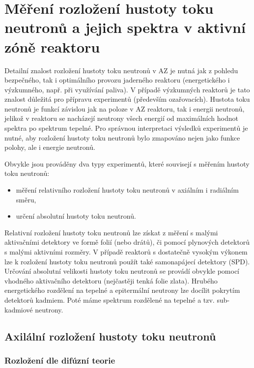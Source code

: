 \section[Měření rozložení hustoty toku]{Měření rozložení hustoty toku neutronů a jejich spektra v aktivní zóně reaktoru}

Detailní znalost rozložení hustoty toku neutronů v AZ je nutná jak z pohledu bezpečného, tak i optimálního provozu jaderného reaktoru (energetického i výzkumného, např. při využívání paliva). V případě výzkumných reaktorů je tato znalost důležitá pro přípravu experimentů (především ozařovacích). Hustota toku neutronů je funkcí závislou jak na poloze v AZ reaktoru, tak i energii neutronů, jelikož v reaktoru se nacházejí neutrony všech energií od maximálních hodnot spektra po spektrum tepelné. Pro správnou interpretaci výsledků experimentů je nutné, aby rozložení hustoty toku neutronů bylo zmapováno nejen jako funkce polohy, ale i energie neutronů.

Obvykle jsou prováděny dva typy experimentů, které souvisejí s měřením hustoty toku neutronů:

\begin{itemize}%
    \item měření relativního rozložení hustoty toku neutronů v axiálním i radiálním směru,
    \item určení absolutní hustoty toku neutronů.
\end{itemize}

Relativní rozložení hustoty toku neutronů lze získat z měření s malými aktivačními detektory ve formě folií (nebo drátů), či pomocí plynových detektorů s malými aktivními rozměry. V případě reaktorů s dostatečně vysokým výkonem lze k rozložení hustoty toku neutronů použít také samonapájecí detektory (SPD). Určování absolutní velikosti hustoty toku neutronů se provádí obvykle pomocí vhodného aktivačního detektoru (nejčastěji tenká folie zlata). Hrubého energetického rozdělení na tepelné a epitermální neutrony lze docílit pokrytím detektorů kadmiem. Poté máme spektrum rozdělené na tepelné a tzv. sub-kadmiové neutrony.

\subsection{Axilální rozložení hustoty toku neutronů}

\subsubsection{Rozložení dle difúzní teorie}

